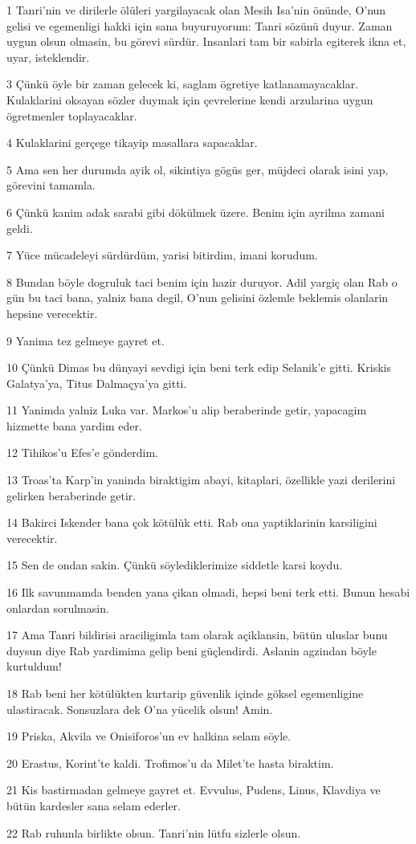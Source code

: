 \par 1 Tanri'nin ve dirilerle ölüleri yargilayacak olan Mesih Isa'nin önünde, O'nun gelisi ve egemenligi hakki için sana buyuruyorum: Tanri sözünü duyur. Zaman uygun olsun olmasin, bu görevi sürdür. Insanlari tam bir sabirla egiterek ikna et, uyar, isteklendir.
\par 3 Çünkü öyle bir zaman gelecek ki, saglam ögretiye katlanamayacaklar. Kulaklarini oksayan sözler duymak için çevrelerine kendi arzularina uygun ögretmenler toplayacaklar.
\par 4 Kulaklarini gerçege tikayip masallara sapacaklar.
\par 5 Ama sen her durumda ayik ol, sikintiya gögüs ger, müjdeci olarak isini yap, görevini tamamla.
\par 6 Çünkü kanim adak sarabi gibi dökülmek üzere. Benim için ayrilma zamani geldi.
\par 7 Yüce mücadeleyi sürdürdüm, yarisi bitirdim, imani korudum.
\par 8 Bundan böyle dogruluk taci benim için hazir duruyor. Adil yargiç olan Rab o gün bu taci bana, yalniz bana degil, O'nun gelisini özlemle beklemis olanlarin hepsine verecektir.
\par 9 Yanima tez gelmeye gayret et.
\par 10 Çünkü Dimas bu dünyayi sevdigi için beni terk edip Selanik'e gitti. Kriskis Galatya'ya, Titus Dalmaçya'ya gitti.
\par 11 Yanimda yalniz Luka var. Markos'u alip beraberinde getir, yapacagim hizmette bana yardim eder.
\par 12 Tihikos'u Efes'e gönderdim.
\par 13 Troas'ta Karp'in yaninda biraktigim abayi, kitaplari, özellikle yazi derilerini gelirken beraberinde getir.
\par 14 Bakirci Iskender bana çok kötülük etti. Rab ona yaptiklarinin karsiligini verecektir.
\par 15 Sen de ondan sakin. Çünkü söylediklerimize siddetle karsi koydu.
\par 16 Ilk savunmamda benden yana çikan olmadi, hepsi beni terk etti. Bunun hesabi onlardan sorulmasin.
\par 17 Ama Tanri bildirisi araciligimla tam olarak açiklansin, bütün uluslar bunu duysun diye Rab yardimima gelip beni güçlendirdi. Aslanin agzindan böyle kurtuldum!
\par 18 Rab beni her kötülükten kurtarip güvenlik içinde göksel egemenligine ulastiracak. Sonsuzlara dek O'na yücelik olsun! Amin.
\par 19 Priska, Akvila ve Onisiforos'un ev halkina selam söyle.
\par 20 Erastus, Korint'te kaldi. Trofimos'u da Milet'te hasta biraktim.
\par 21 Kis bastirmadan gelmeye gayret et. Evvulus, Pudens, Linus, Klavdiya ve bütün kardesler sana selam ederler.
\par 22 Rab ruhunla birlikte olsun. Tanri'nin lütfu sizlerle olsun.


